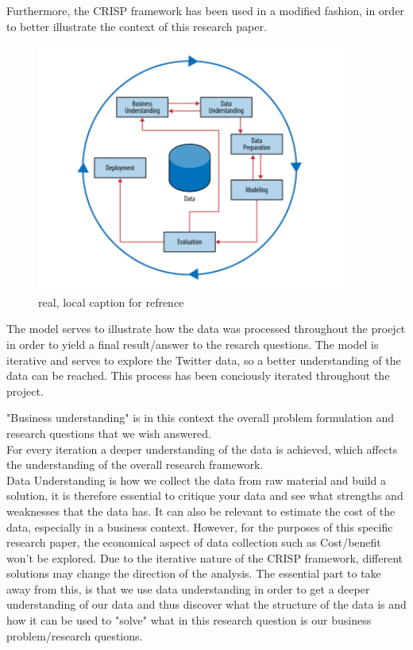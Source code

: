 \documentclass{article}
\begin{document}
Furthermore,  the CRISP framework has been used in a modified fashion, in order to better illustrate the context of this research paper.\\

\begin{figure}[H] %
	\centering %
\includegraphics [scale= .95]  {CRISP.PNG}    %
	\caption[Optional caption] {real, local caption for refrence}
	\label{fig:wordcloudBliz}

\end{figure}


The model serves to illustrate how the data was processed throughout the proejct in order to yield a final result/answer to the resarch questions. The model is iterative and serves to explore the Twitter data, so a better
understanding of the data can be reached. This process has been conciously iterated throughout the project.

"Business understanding" is in this context the overall problem formulation and research questions that we wish answered.\\
For every iteration a deeper understanding of the data is achieved, which affects the understanding of the overall research framework.\\

Data Understanding is how we collect the data from raw material and build a solution, it is therefore essential to critique your data and see what strengths and weaknesses that the data has. It can also be relevant to estimate the cost of the data, especially in a business context. However, for the purposes of this specific research paper, the economical aspect of data collection such as Cost/benefit won't be explored. Due to the iterative nature of the CRISP framework, different solutions may change the direction of the analysis. The essential part to take away from this, is that we use data understanding in order to get a deeper understanding of our data and thus discover what the structure of the data is and how it can be used to "solve" what in this research question is our business problem/research questions.
\end{document}
